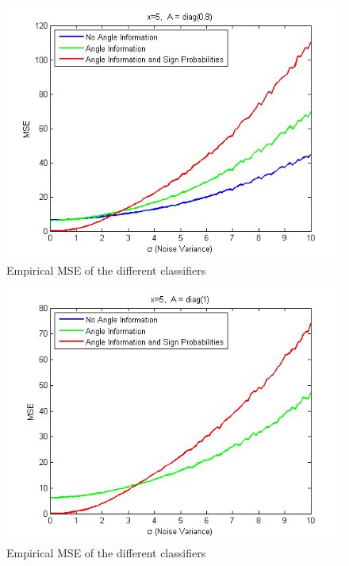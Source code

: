 \documentclass[english]{article}
\begin{document}
\begin{figure}[h!]
\centering
\includegraphics[width=5in]{mse_2.png}
\caption{Empirical MSE of the different classifiers}
\label{fig:mse_2}
\end{figure}

\begin{figure}[h!]
\centering
\includegraphics[width=5in]{mse_3.png}
\caption{Empirical MSE of the different classifiers}
\label{fig:mse_3}
\end{figure}
\end{document}
